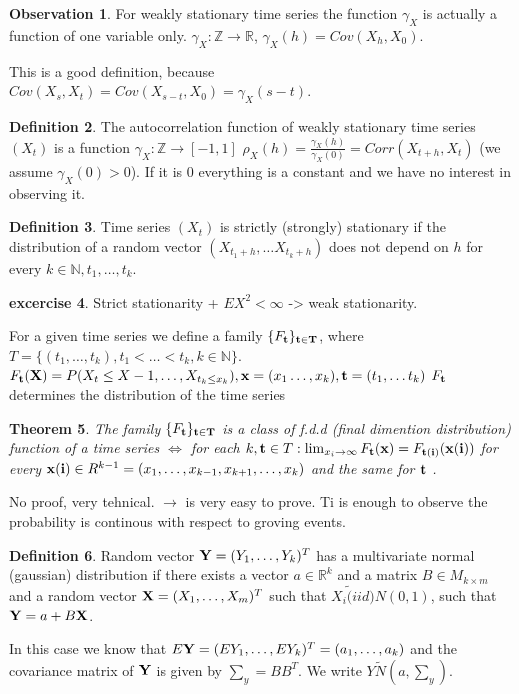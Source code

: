 \documentclass[12pt,a4paper]{amsart}
\theoremstyle{definition} %
\newtheorem{defn}{Definition}[section]
\newtheorem{excercise}[defn]{excercise}
\newtheorem{observation}[defn]{Observation}
\theoremstyle{plain} %
\newtheorem{theorem}[defn]{Theorem}
\newcommand{\R}{\mathbb R}
\newcommand{\N}{\mathbb N}
\newcommand{\Z}{\mathbb Z}
\begin{document}
\begin{observation}
For weakly stationary time series the function $\gamma_X$ is actually a function of one variable only. 
$\gamma_X : \Z \rightarrow \R$,
$\gamma_X(h) = Cov(X_h, X_0)$.

This is a good definition, because $Cov(X_s, X_t) = Cov(X_{s-t},X_0) = \gamma_X(s-t)$. 
\end{observation}


\begin{defn}
The autocorrelation function of weakly stationary time series $(X_t)$ is a function
$\gamma_X : \Z \rightarrow [-1, 1]$
$\rho_X(h) = \frac{\gamma_X(h)}{\gamma_X(0)} = Corr(X_{t+h},X_t)$
(we assume $\gamma_X(0) > 0$). If it is $0$ everything is a constant and we have no interest in observing it.
\end{defn}

\begin{defn}
Time series $(X_t)$ is strictly (strongly) stationary if the distribution of a random vector $(X_{t_1 + h}, \dots X_{t_k + h})$ does not depend on $h$ for every $k\in \N, t_1, \dots, t_k$.
\end{defn}

\begin{excercise}
Strict stationarity + $EX^2 < \infty$ -> weak stationarity.
\end{excercise}

For a given time series we define a family 
$\{  F_{\bf t} \}_{\bf t \in T}$, where $T = \{(t_1, \dots, t_k), t_1 < \dots < t_k, k \in \N\}$.
$F_{\bf t}({\bf X}) = P(X_t \leq X-1, \dots, X_{t_k \leq x_k}), {\bf x} = (x_1 \dots, x_k), {\bf t} = (t_1, \dots t_k)$
$F_{ \bf t}$ determines the distribution of the time series


\begin{theorem}
The family $\{F_{\bf t}\}_{\bf t \in T}$ is a class of f.d.d (final dimention distribution) function of a time series
$\Leftrightarrow$
for each $k, {\bf t } \in T: \lim_{x_i \rightarrow \infty} F_{\bf t}({\bf x}) = F_{\bf t(i)}({\bf x(i)})$
for every ${\bf x(i)} \in R^{k-1} = (x_1,\dots,x_{k-1},x_{k+1},\dots, x_k)$ and the same for ${\bf t}$ .
\end{theorem}
\proof
No proof, very tehnical. 
$\rightarrow$ is very easy to prove. Ti is enough to observe the probability is continous with respect to groving events.
\endproof



\begin{defn}
Random vector ${\bf Y } = (Y_1, \dots, Y_k)^T$ has a multivariate normal (gaussian) distribution if there exists a vector $a \in \R^k$ and a matrix $B \in M_{k\times m}$ and a random vector ${\bf X} = (X_1, \dots, X_m)^T$ such that $X_i \tilde(iid) N(0,1)$, such that ${\bf Y} = a + B {\bf X}$.

In this case we know that $E{\bf Y} = (EY_1, \dots, EY_k)^T = (a_1, \dots, a_k)$ and the covariance matrix of ${\bf Y}$ is given by $\sum_y = B B^T$.
We write $Y \tilde N(a, \sum_y)$.

\end{defn}
\end{document}
